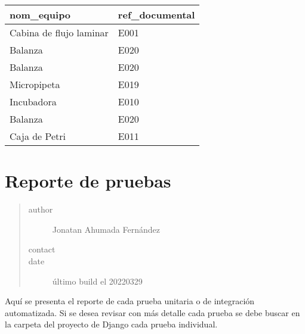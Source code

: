 \documentclass[letterpaper,10pt,spanish]{sphinxmanual}
\begin{document}
\begin{savenotes}\sphinxattablestart
\centering
\begin{tabulary}{\linewidth}[t]{|T|T|}
\hline
\sphinxstyletheadfamily 
nom\_equipo
&\sphinxstyletheadfamily 
ref\_documental
\\
\hline
Cabina de flujo laminar
&
E001
\\
\hline
Balanza
&
E020
\\
\hline
Balanza
&
E020
\\
\hline
Micropipeta
&
E019
\\
\hline
Incubadora
&
E010
\\
\hline
Balanza
&
E020
\\
\hline
Caja de Petri
&
E011
\\
\hline
\end{tabulary}
\par
\sphinxattableend\end{savenotes}


\chapter{Reporte de pruebas}
\label{\detokenize{requerimientos/reporte_pruebas:reporte-de-pruebas}}\label{\detokenize{requerimientos/reporte_pruebas::doc}}\begin{quote}\begin{description}
\item[{author}] \leavevmode
Jonatan Ahumada Fernández

\item[{contact}] \leavevmode
{}

\item[{date}] \leavevmode
último build el 2022\sphinxhyphen{}03\sphinxhyphen{}29

\end{description}\end{quote}

Aquí se presenta el reporte de cada prueba unitaria o de integración automatizada.
Si se desea revisar con más detalle cada prueba se debe buscar en la carpeta 
del proyecto de Django cada prueba individual.
\end{document}
